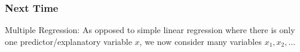 \documentclass[slides]{beamer}
\newcommand{\blue}[1]{\textcolor{blue2}{#1}}
\begin{document}
%
%
%
%
%
%


\begin{frame}[fragile]
\frametitle{Next Time}

Multiple Regression:  As opposed to \blue{simple linear regression} where there is only one predictor/explanatory variable $x$, we now consider \blue{many} variables $x_1, x_2, \ldots$

\end{frame}
\end{document}
